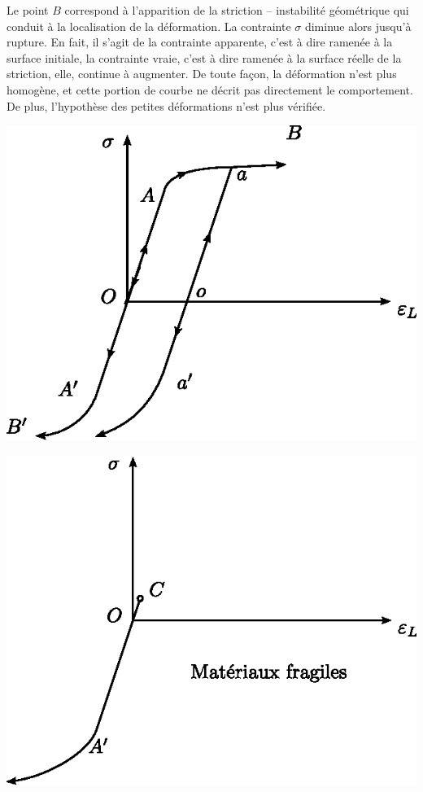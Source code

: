 Le point $B$ correspond à l'apparition de la striction -- instabilité géométrique qui conduit à la localisation de la déformation.
La contrainte $\sigma$ diminue alors jusqu'à rupture.
En fait, il s'agit de la contrainte apparente, c'est à dire ramenée à la surface initiale, la contrainte vraie, c'est à dire ramenée à la surface réelle de la striction, elle, continue à augmenter.
De toute façon, la déformation n'est plus homogène, et cette portion de courbe ne décrit pas directement le comportement.
De plus, l'hypothèse des petites dé­formations n'est plus vérifiée.
\begin{multicols}{2}
    \begin{center}
        \includegraphics{../images/T1_Ch04-0013}
    \end{center}
    \columnbreak
    \begin{center}
        \includegraphics{../images/T1_Ch04-0014}
    \end{center}
\end{multicols}

